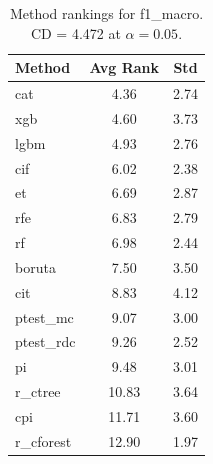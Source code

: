 \begin{table}[h]
\centering
\caption{Method rankings for f1_macro. CD = 4.472 at $\alpha=0.05$.}
\label{tab:ranks_f1_macro}
\begin{tabular}{lcc}
\toprule
Method & Avg Rank & Std \\
\midrule
cat & 4.36 & 2.74 \\
xgb & 4.60 & 3.73 \\
lgbm & 4.93 & 2.76 \\
cif & 6.02 & 2.38 \\
et & 6.69 & 2.87 \\
rfe & 6.83 & 2.79 \\
rf & 6.98 & 2.44 \\
boruta & 7.50 & 3.50 \\
cit & 8.83 & 4.12 \\
ptest_mc & 9.07 & 3.00 \\
ptest_rdc & 9.26 & 2.52 \\
pi & 9.48 & 3.01 \\
r_ctree & 10.83 & 3.64 \\
cpi & 11.71 & 3.60 \\
r_cforest & 12.90 & 1.97 \\
\bottomrule
\end{tabular}
\end{table}